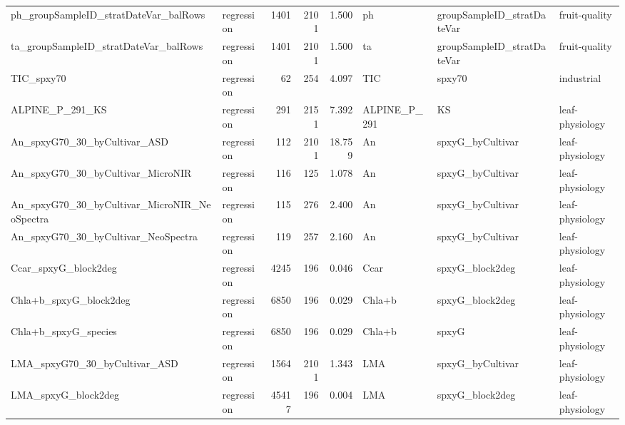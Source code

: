 \begin{landscape}
\begin{longtable}{L{6.2cm}L{2.1cm}rrrL{6.0cm}L{2.6cm}L{3.0cm}}
ph\_\allowbreak{}groupSampleID\_\allowbreak{}stratDateVar\_\allowbreak{}balRows & regression & 1401 & 2101 & 1.500 & ph & groupSampleID\_\allowbreak{}stratDateVar & fruit-\allowbreak{}quality \\
ta\_\allowbreak{}groupSampleID\_\allowbreak{}stratDateVar\_\allowbreak{}balRows & regression & 1401 & 2101 & 1.500 & ta & groupSampleID\_\allowbreak{}stratDateVar & fruit-\allowbreak{}quality \\
TIC\_\allowbreak{}spxy70 & regression & 62 & 254 & 4.097 & TIC & spxy70 & industrial \\
ALPINE\_\allowbreak{}P\_\allowbreak{}291\_\allowbreak{}KS & regression & 291 & 2151 & 7.392 & ALPINE\_\allowbreak{}P\_\allowbreak{}291 & KS & leaf-\allowbreak{}physiology \\
An\_\allowbreak{}spxyG70\_\allowbreak{}30\_\allowbreak{}byCultivar\_\allowbreak{}ASD & regression & 112 & 2101 & 18.759 & An & spxyG\_\allowbreak{}byCultivar & leaf-\allowbreak{}physiology \\
An\_\allowbreak{}spxyG70\_\allowbreak{}30\_\allowbreak{}byCultivar\_\allowbreak{}MicroNIR & regression & 116 & 125 & 1.078 & An & spxyG\_\allowbreak{}byCultivar & leaf-\allowbreak{}physiology \\
An\_\allowbreak{}spxyG70\_\allowbreak{}30\_\allowbreak{}byCultivar\_\allowbreak{}MicroNIR\_\allowbreak{}NeoSpectra & regression & 115 & 276 & 2.400 & An & spxyG\_\allowbreak{}byCultivar & leaf-\allowbreak{}physiology \\
An\_\allowbreak{}spxyG70\_\allowbreak{}30\_\allowbreak{}byCultivar\_\allowbreak{}NeoSpectra & regression & 119 & 257 & 2.160 & An & spxyG\_\allowbreak{}byCultivar & leaf-\allowbreak{}physiology \\
Ccar\_\allowbreak{}spxyG\_\allowbreak{}block2deg & regression & 4245 & 196 & 0.046 & Ccar & spxyG\_\allowbreak{}block2deg & leaf-\allowbreak{}physiology \\
Chla+b\_\allowbreak{}spxyG\_\allowbreak{}block2deg & regression & 6850 & 196 & 0.029 & Chla+b & spxyG\_\allowbreak{}block2deg & leaf-\allowbreak{}physiology \\
Chla+b\_\allowbreak{}spxyG\_\allowbreak{}species & regression & 6850 & 196 & 0.029 & Chla+b & spxyG & leaf-\allowbreak{}physiology \\
LMA\_\allowbreak{}spxyG70\_\allowbreak{}30\_\allowbreak{}byCultivar\_\allowbreak{}ASD & regression & 1564 & 2101 & 1.343 & LMA & spxyG\_\allowbreak{}byCultivar & leaf-\allowbreak{}physiology \\
LMA\_\allowbreak{}spxyG\_\allowbreak{}block2deg & regression & 45417 & 196 & 0.004 & LMA & spxyG\_\allowbreak{}block2deg & leaf-\allowbreak{}physiology \\

\end{longtable}
\end{landscape}
